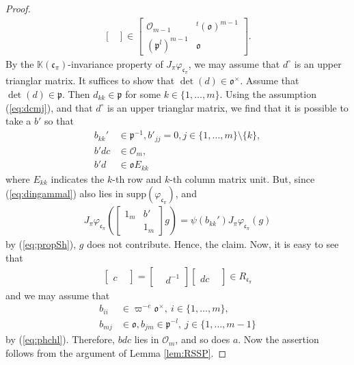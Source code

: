 \documentclass[11pt]{amsart}
\newcommand\Vp{\varpi}%
\newcommand\vp{\varphi}%
\newcommand\oo{\mathfrak{o}}
\newcommand\p{{\mathfrak{p}}}
\newcommand\cf{{\mathfrak{c}}}
\newcommand\K{{\mathbb{K}}}
\newcommand\Oc{{\mathcal{O}}}
\newcommand\1{\mathbf{1}}
\newcommand\tm{\times}
\newcommand\supp{{\mathrm{supp}}}%
\numberwithin{equation}{section}
\begin{document}
\begin{proof}
\begin{align*}
\begin{bmatrix}
\end{bmatrix} \in \begin{bmatrix}
\Oc_{m-1} & {}^t(\oo)^{m-1}  \\
(\p^l)^{m-1} & \oo
\end{bmatrix}.
\end{align*} 
By the $\K(\cf_\pi)$-invariance property of $J_\pi \vp_{\cf_\pi}$, we may assume that $d^\circ$ is an upper trianglar matrix.
It suffices to show that $\det(d)\in \oo^\tm$.
Assume that $\det(d) \in \p$.
Then $d_{kk} \in \p$ for some $k \in \{1, \ldots, m\}$.
Using the assumption (\ref{eq:dcmj}), and that $d^\circ$ is an upper trianglar matrix, we find that it is possible to take a $b'$ so that 
\begin{align*}
b_{kk}' &\in \p^{-1}, b'_{jj} =0, j \in \{1, \ldots, m\} \setminus \{k\},  \\
b'd c &\in \Oc_m, \\
b'd &\in \oo E_{kk}
\end{align*}
where $E_{kk}$ indicates the $k$-th row and $k$-th column matrix unit.
But, since (\ref{eq:dingammal}) also lies in $\supp(\vp_{\cf_\pi})$, and  
\begin{align*}
J_\pi \vp_{\cf_\pi}(\begin{bmatrix}
1_m & b' \\
& 1_m
\end{bmatrix} g) = \psi(b_{kk}') J_\pi \vp_{\cf_\pi}(g)
\end{align*} 
by (\ref{eq:propSh}), $g$ does not contribute.
Hence, the claim.
Now, it is easy to see that 
\begin{align*}
\begin{bmatrix}
&  \\
c & 
\end{bmatrix} = \begin{bmatrix}
&  \\
 & d^{-1} 
\end{bmatrix}\begin{bmatrix}
&  \\
d c & 
\end{bmatrix} \in R_{\cf_\pi}
\end{align*} 
and we may assume that 
\begin{align*}
b_{ii} &\in \Vp^{-e}\oo^\tm, \ i \in \{1, \ldots, m\}, \\ 
b_{mj} &\in \oo, b_{jm} \in \p^{-l}, \ j \in \{1, \ldots, m-1\}
\end{align*} 
by (\ref{eq:phchl}).
Therefore, $bdc$ lies in $\Oc_m$, and so does $a$.
Now the assertion follows from the argument of Lemma \ref{lem:RSSP}.
\end{proof}
\end{document}
